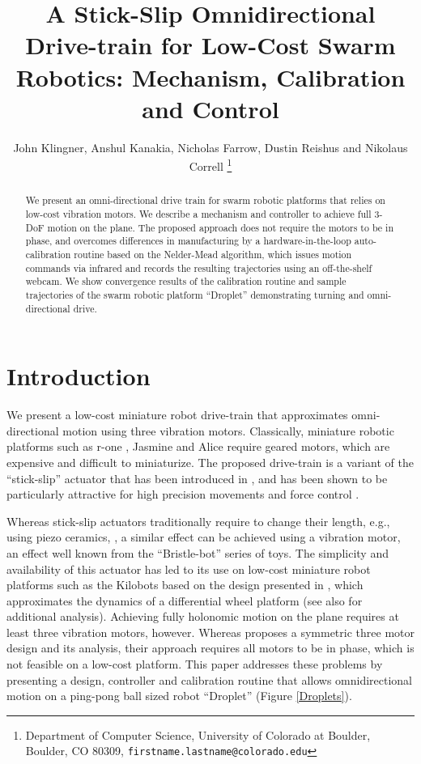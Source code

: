 \documentclass[letterpaper, 10pt, conference]{ieeeconf}
\title{\LARGE \bf
A Stick-Slip Omnidirectional Drive-train for Low-Cost Swarm Robotics: Mechanism, Calibration and Control
}
\author{John Klingner, Anshul Kanakia, Nicholas Farrow, Dustin Reishus and Nikolaus Correll%
\thanks{Department of Computer Science,
University of Colorado at Boulder,
 Boulder, CO 80309,
{\tt\small firstname.lastname{@}colorado.edu}}%
}
\begin{document}
\maketitle


\begin{abstract}
We present an omni-directional drive train for swarm robotic platforms that relies on low-cost vibration motors. We describe a mechanism and controller to achieve full 3-DoF motion on the plane. The proposed approach does not require the motors to be in phase, and overcomes differences in manufacturing by a hardware-in-the-loop auto-calibration routine based on the Nelder-Mead algorithm, which issues motion commands via infrared and records the resulting trajectories using an off-the-shelf webcam. We show convergence results of the calibration routine and sample trajectories of the swarm robotic platform ``Droplet'' demonstrating turning and omni-directional drive.   
\end{abstract}



\section{Introduction}
We present a low-cost miniature robot drive-train that approximates omni-directional motion using three vibration motors. Classically, miniature robotic platforms such as r-one \cite{mclurkin2013low}, Jasmine \cite{jasmine} and Alice \cite{alice} require geared motors, which are expensive and difficult to miniaturize. The proposed drive-train is a variant of the ``stick-slip'' actuator that has been introduced in \cite{breguet1998stick}, and has been shown to be particularly attractive for high precision movements \cite{brufau2005micron,chu2006novel,martel2001three,martel2005fundamental,eigoli2012locomotion} and force control \cite{vartholomeos2008analysis}.   

Whereas stick-slip actuators traditionally require to change their length, e.g., using piezo ceramics,  \cite{breguet1998stick, martel2005fundamental}, a similar effect can be achieved using a vibration motor, an effect well known from the ``Bristle-bot'' series of toys. The simplicity and availability of this actuator  has led to its use on low-cost miniature robot platforms such as the Kilobots \cite{rubenstein2012kilobot} based on the design presented in \cite{Vartholomeos2006}, which approximates the dynamics of a differential wheel platform (see also \cite{spartali2013speed} for additional analysis). Achieving fully holonomic motion on the plane requires at least three vibration motors, however. Whereas \cite{Vartholomeos2005} proposes a symmetric three motor design and its analysis, their approach requires all motors to be in phase, which is not feasible on a low-cost platform. This paper addresses these problems by presenting a design, controller and calibration routine that allows omnidirectional motion on a ping-pong ball sized robot ``Droplet'' (Figure \ref{Droplets}).
\end{document}
